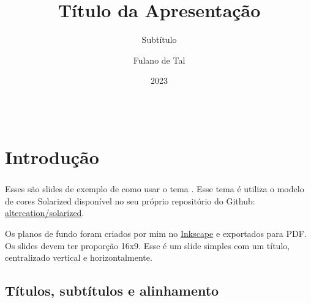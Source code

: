 \documentclass[aspectratio=169]{beamer}
\title{Título da Apresentação}
\subtitle{Subtítulo}
\date{2023}
\author[Fulano]{Fulano de Tal}
\begin{document}
\maketitle

{
\def\insertframenumber{\emph{idx}}
\begin{frame}[t]\frametitle{\inserttitle}\framesubtitle{\insertsubtitle}

  \begin{columns}[T]
    \begin{column}{.5\textwidth}
     \tableofcontents[hidesubsections,sections={1-4}]
    \end{column}
    \begin{column}{.5\textwidth}
      \tableofcontents[hidesubsections,sections={5-8}]
    \end{column}
  \end{columns}
  \addtocounter{framenumber}{-1}
\end{frame}
}

\section{Introdução}

\begin{frame}[c]\frametitle{\secname}\centering
  Esses são slides de exemplo de como usar o tema .
  Esse tema é utiliza o modelo de cores Solarized disponível no seu próprio repositório do Github: \href{https://github.com/altercation/solarized}{altercation/solarized}.

  Os planos de fundo foram criados por mim no \href{https://inkscape.org/}{Inkscape} e exportados para PDF.
  Os slides devem ter proporção 16x9.
  Esse é um slide simples com um título, centralizado vertical e horizontalmente.
\end{frame}

\subsection{Títulos, subtítulos e alinhamento}
\end{document}
